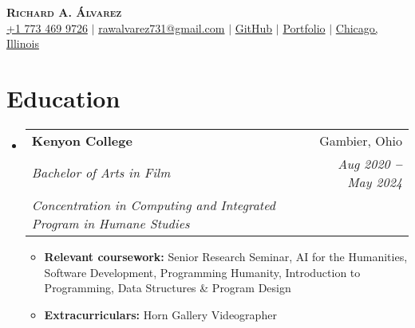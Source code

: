 \documentclass[letterpaper,11pt]{article}
\makeatletter
\newcommand{\resumeItem}[1]{
  \item\small{
    {#1 \vspace{-2pt}}
  }
}
\newcommand{\resumeSubheading}[4]{
  \vspace{-2pt}\item
    \begin{tabular*}{0.97\textwidth}[t]{l@{\extracolsep{\fill}}r}
      \textbf{#1} & #2 \\
      \textit{\small#3} & \textit{\small #4} \\
    \end{tabular*}\vspace{-7pt}
}
\newcommand{\resumeEducationHeading}[6]{
  \vspace{-2pt}\item
    \begin{tabular*}{0.97\textwidth}[t]{l@{\extracolsep{\fill}}r}
      \textbf{#1} & #2 \\
      \textit{\small#3} & \textit{\small #4} \\
      \textit{\small#5} & \textit{\small #6} \\
    \end{tabular*}\vspace{-5pt}
}
\newcommand{\resumeSubHeadingListStart}{\begin{itemize}[leftmargin=0.15in, label={}]}
\newcommand{\resumeSubHeadingListEnd}{\end{itemize}}
\newcommand{\resumeItemListStart}{\begin{itemize}}
\newcommand{\resumeItemListEnd}{\end{itemize}\vspace{-5pt}}
\makeatother
\begin{document}

\begin{center}
    \textbf{\Huge \scshape Richard A. Álvarez} \\ \vspace{3pt}
    \vspace{12pt}
    \small
    \faMobile \hspace{.5pt} \href{tel:7734699726}{+1 773 469 9726}
    $|$
    \faAt \hspace{.5pt} \href{mailto:rawalvarez731@gmail.com}{rawalvarez731@gmail.com}
    $|$
    \faGithub \hspace{.5pt} \href{https://github.com/raulduk3}{GitHub}
    $|$
    \faGlobe \hspace{.5pt} \href{https://raulduke.com}{Portfolio}
    $|$
    \faMapMarker \hspace{.5pt} \href{https://www.google.com/maps/place/Chicago,+IL/@41.833871,-87.8967704,11z/data=!3m1!4b1!4m6!3m5!1s0x880e2c3cd0f4cbed:0xafe0a6ad09c0c000!8m2!3d41.8781136!4d-87.6297982!16zL20vMDFfZDQ?entry=ttu}{Chicago, Illinois}
\end{center}




\section{Education}
  \vspace{3pt}
  \resumeSubHeadingListStart
    
    \resumeEducationHeading
      {Kenyon College
      }{Gambier, Ohio}
      {Bachelor of Arts in Film}   {Aug 2020 \textbf{--} May 2024}
      {Concentration in Computing and Integrated Program in Humane Studies} {}
		\resumeItemListStart
		    \resumeItem{\textbf{Relevant coursework:} {Senior Research Seminar, AI for the Humanities, Software Development, Programming Humanity, Introduction to Programming, Data Structures \& Program Design}}
            \resumeItem{\textbf{Extracurriculars:} {Horn Gallery Videographer}}
        \resumeItemListEnd
    
	\iffalse
		\resumeSubheading
		  {Walter Payton College Preparatory 
		  }{Chicago, Illinois}
		  {High School Diploma}{Sep 2016 \textbf{--} Jun 2020}
     \fi
    
  \resumeSubHeadingListEnd
\end{document}
